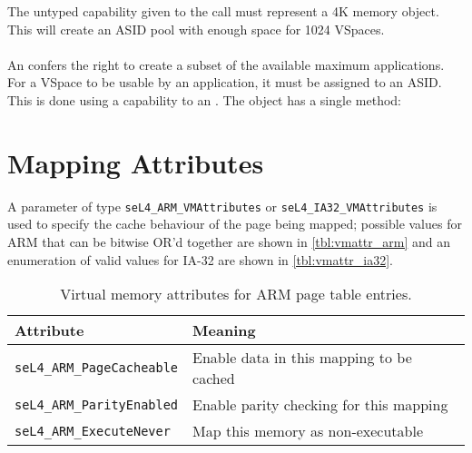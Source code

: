 The untyped
capability given to the  call must represent a 4K memory object.
This will create an ASID pool with enough space for 1024 VSpaces.

\paragraph{}

An  confers the right to create a subset of the available
maximum applications. For a VSpace to be usable by an application, it
must be assigned to an ASID. This is done using a capability to an
. The  object has a single method:
\vspace{2ex}\\

\section{Mapping Attributes}
A parameter of type \texttt{seL4\_ARM\_VMAttributes} or
\texttt{seL4\_IA32\_VMAttributes} is used to specify the cache behaviour of the
page being mapped; possible values for ARM that can be bitwise OR'd together are
shown in \autoref{tbl:vmattr_arm} \ifxeightsix and an enumeration of valid values
for IA-32 are shown in \autoref{tbl:vmattr_ia32}\fi.

\begin{table}[htb]
  \begin{center}
    \begin{tabularx}{\textwidth}{p{}X}
      \toprule
      Attribute & Meaning \\
      \midrule
      \texttt{seL4\_ARM\_PageCacheable} & Enable data in this mapping
      to be cached \\
      \texttt{seL4\_ARM\_ParityEnabled} & Enable parity checking for
      this mapping\\
      \texttt{seL4\_ARM\_ExecuteNever} & Map this memory as non-executable \\
      \bottomrule
    \end{tabularx}
    \caption{\label{tbl:vmattr_arm} Virtual memory attributes for ARM page
      table entries.}
  \end{center}
\end{table}


